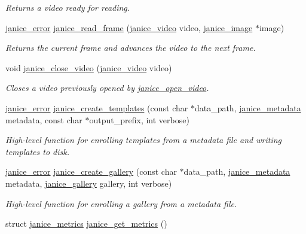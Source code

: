 \begin{DoxyCompactItemize}
\begin{DoxyCompactList}\small\item\em Returns a video ready for reading. \end{DoxyCompactList}\item 
\hyperlink{group__janice_ga4873d49c1f9d6a6880dfbd485cf6ba72}{janice\+\_\+error} \hyperlink{group__janice__io_gae0bc9ecbd8d16aa8e9c8483844b64140}{janice\+\_\+read\+\_\+frame} (\hyperlink{group__janice__io_ga01c80201c1ce11f8c7a52cf9493b3ee2}{janice\+\_\+video} video, \hyperlink{structjanice__image}{janice\+\_\+image} $\ast$image)
\begin{DoxyCompactList}\small\item\em Returns the current frame and advances the video to the next frame. \end{DoxyCompactList}\item 
void \hyperlink{group__janice__io_ga48b8438cfe4cfe35a3b2978c01c6df6e}{janice\+\_\+close\+\_\+video} (\hyperlink{group__janice__io_ga01c80201c1ce11f8c7a52cf9493b3ee2}{janice\+\_\+video} video)
\begin{DoxyCompactList}\small\item\em Closes a video previously opened by \hyperlink{group__janice__io_ga279c7c207337e0cec2272090583668e0}{janice\+\_\+open\+\_\+video}. \end{DoxyCompactList}\item 
\hyperlink{group__janice_ga4873d49c1f9d6a6880dfbd485cf6ba72}{janice\+\_\+error} \hyperlink{group__janice__io_ga21f06e1b6bab45273418901dd7300470}{janice\+\_\+create\+\_\+templates} (const char $\ast$data\+\_\+path, \hyperlink{group__janice__io_ga98fb8d1945016f13408aa772de4c3e64}{janice\+\_\+metadata} metadata, const char $\ast$output\+\_\+prefix, int verbose)
\begin{DoxyCompactList}\small\item\em High-\/level function for enrolling templates from a metadata file and writing templates to disk. \end{DoxyCompactList}\item 
\hyperlink{group__janice_ga4873d49c1f9d6a6880dfbd485cf6ba72}{janice\+\_\+error} \hyperlink{group__janice__io_ga42bee619c1768885e1d939367e1e4259}{janice\+\_\+create\+\_\+gallery} (const char $\ast$data\+\_\+path, \hyperlink{group__janice__io_ga98fb8d1945016f13408aa772de4c3e64}{janice\+\_\+metadata} metadata, \hyperlink{group__janice_ga08feff1c2835b44332afeda80c3d0fb7}{janice\+\_\+gallery} gallery, int verbose)
\begin{DoxyCompactList}\small\item\em High-\/level function for enrolling a gallery from a metadata file. \end{DoxyCompactList}\item 
\hypertarget{group__janice__io_gaa6aa5fa8550b3066a0dad696d6368762}{}struct \hyperlink{structjanice__metrics}{janice\+\_\+metrics} \hyperlink{group__janice__io_gaa6aa5fa8550b3066a0dad696d6368762}{janice\+\_\+get\+\_\+metrics} ()\label{group__janice__io_gaa6aa5fa8550b3066a0dad696d6368762}


\end{DoxyCompactItemize}
